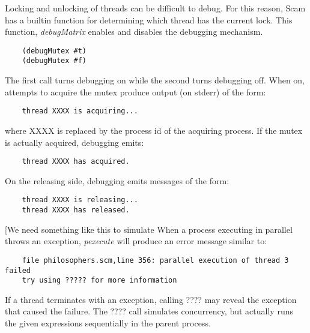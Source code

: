 Locking and unlocking of threads can be difficult to debug.  For this reason, 
Scam has a builtin function for determining which thread has the current lock.
This function, {\it debugMatrix} enables and disables the debugging mechanism.

\begin{verbatim}
    (debugMutex #t)
    (debugMutex #f)
\end{verbatim}

The first call turns debugging on while the second turns debugging off. When
on, attempts to acquire the mutex produce output (on stderr) of
the form:

\begin{verbatim}
    thread XXXX is acquiring...
\end{verbatim}

where XXXX is replaced by the process id of the acquiring process.
If the mutex is actually acquired, debugging emits:

\begin{verbatim}
    thread XXXX has acquired.
\end{verbatim}

On the releasing side, debugging emits messages of the form:

\begin{verbatim}
    thread XXXX is releasing...
    thread XXXX has released.
\end{verbatim}

[We need something like this to simulate 
When a process executing in parallel throws an exception, {\it pexecute} will
produce an error message similar to:

\begin{verbatim}
    file philosophers.scm,line 356: parallel execution of thread 3 failed
    try using ????? for more information
\end{verbatim}

If a thread terminates with an exception,
calling ???? may reveal the
exception that caused the failure.
The ???? call simulates concurrency, but actually runs the
given expressions sequentially in the parent process.
